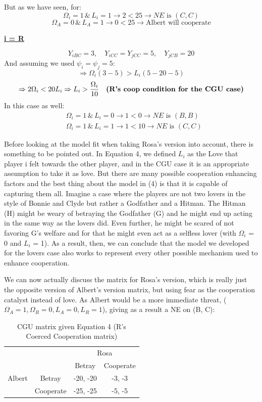 \documentclass[11pt, a4paper]{article}
\begin{document}
But as we have seen, for:
$$
\Omega_i=1 \, \& \, L_i=1 \rightarrow 2<25 \rightarrow N E \text { is }(C, C)
$$
$$
\Omega_A=0 \, \& \, L_A=1 \rightarrow 0<25 \rightarrow \text{Albert will cooperate}
$$ 

\textbf{\underline{i = R}}

$$
Y_{i B C}=3, \quad Y_{i C C}=Y_{j C C}=5, \quad Y_{j C B}=20
$$
And assuming we used $\psi_i=\psi_j=5$:
$$
\Rightarrow \Omega_i(3-5)>L_i(5-20-5)
$$
$$
\Rightarrow 2 \Omega_i<20 L_i \Rightarrow L_i > \frac{\Omega_i}{10} \quad 
\text{\textbf{(R's coop condition for the CGU case)}}
$$ 
In this case as well:
$$
\begin{aligned}
& \Omega_i=1 \, \& \, L_i=0 \rightarrow 1<0 \rightarrow N E \text { is }(B, B) \\
& \Omega_i=1 \, \& \, L_i=1 \rightarrow 1<10 \rightarrow N E \text { is }(C, C)
\end{aligned}
$$

Before looking at the model fit when taking Rosa's version into account, there is something to be pointed out. In Equation 4, we defined $L_i$ as the Love that player i felt towards the other player, and in the CGU case it is an appropriate assumption to take it as love. But there are many possible cooperation enhancing factors and the best thing about the model in (4) is that it is capable of capturing them all. Imagine a case where the players are not two lovers in the style of Bonnie and Clyde but rather a Godfather and a Hitman. The Hitman (H) might be weary of betraying the Godfather (G) and he might end up acting in the same way as the lovers did. Even further, he might be scared of not
favoring G's welfare and for that he might even act as a selfless lover (with $\Omega_i$ = 0 and $L_i$ = 1). As a result, then, we can conclude that the model we developed for the lovers case also works to represent every other possible mechanism used to enhance cooperation.

We can now actually discuss the matrix for Rosa's version, which is really just the opposite version of Albert's version matrix, but using fear as the cooperation catalyst instead of love. As Albert would be a more immediate threat, ($\Omega_A = 1, \Omega_R = 0, L_A = 0, L_R = 1$), giving as a result a NE on (B, C):

\begin{table}[h]
\centering
\begin{tabular}{cc|c|c|}
\cline{3-4}
& & \multicolumn{2}{c|}{Rosa} \\ \cline{3-4}
& & Betray & Cooperate \\ \hline
\multicolumn{1}{|c|}{Albert} & Betray & -20, -20 & -3, -3 \\ \cline{2-4}
\multicolumn{1}{|c|}{} & Cooperate & -25, -25 & -5, -5 \\ \hline
\end{tabular}
\caption{CGU matrix given Equation 4 (R's Coerced Cooperation matrix)}
\label{your_label_here}
\end{table}
\end{document}
